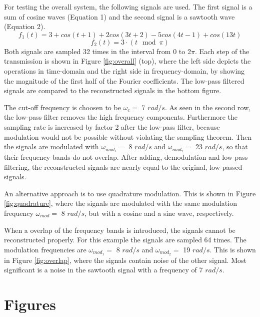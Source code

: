 \documentclass[12pt, a4paper]{report}
\begin{document}
For testing the overall system, the following signals are used.
The first signal is a sum of cosine waves (Equation 1)
and the second signal is a sawtooth wave (Equation 2).
\begin{equation}
	f_1(t) = 3 + cos(t+1) + 2cos(3t+2) - 5cos(4t-1) + cos(13t)
\end{equation}
\begin{equation}
	f_2(t) = 3 \cdot (t\mod\pi)
\end{equation}
Both signals are sampled 32 times in the interval from 0 to 2\(\pi\).
Each step of the transmission is shown in Figure \ref{fig:overall} (top), where the left side depicts the operations in time-domain
and the right side in frequency-domain, by showing the magnitude of the first half of the Fourier coefficients.
The low-pass filtered signals are compared to the reconstructed signals in the bottom figure.

The cut-off frequency is choosen to be \(\omega_c=\) 7 \(rad/s\).
As seen in the second row, the low-pass filter removes the high frequency components.
Furthermore the sampling rate is increased by factor 2 after the low-pass filter,
because modulation would not be possible without violating the sampling theorem.
Then the signals are modulated with \(\omega_{mod_1}=\) 8 \(rad/s\) and \(\omega_{mod_2}=\) 23 \(rad/s\),
so that their frequency bands do not overlap.
After adding, demodulation and low-pass filtering, the reconstructed signals are nearly equal to the original, low-passed signals.

An alternative approach is to use quadrature modulation.
This is shown in Figure \ref{fig:quadrature},
where the signals are modulated with the same modulation frequency \(\omega_{mod}=\) 8 \(rad/s\),
but with a cosine and a sine wave, respectively.

When a overlap of the frequency bands is introduced,
the signals cannot be reconstructed properly.
For this example the signals are sampled 64 times.
The modulation frequencies are \(\omega_{mod_1}=\) 8 \(rad/s\) and \(\omega_{mod_2}=\) 19 \(rad/s\).
This is shown in Figure \ref{fig:overlap},
where the signals contain noise of the other signal.
Most significant is a noise in the sawtooth signal with a frequency of 7 \(rad/s\).


\appendix

\chapter{Figures}
\end{document}
